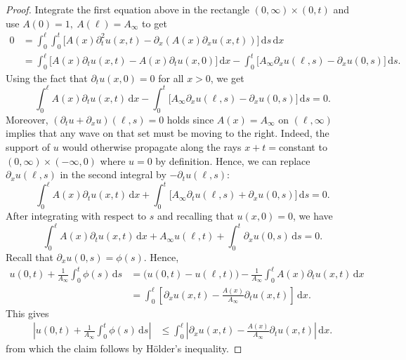 \documentclass[10pt,a4paper]{article}
\theoremstyle{plain}
\theoremstyle{definition}
\theoremstyle{remark}
\numberwithin{equation}{section}
\newcommand{\ds}{\,\mathrm{d}s}
\newcommand{\dx}{\,\mathrm{d}x}
\begin{document}
\begin{proof}
  Integrate the first equation above in the rectangle $(0,\infty) \times (0,t)$ and use $A(0) = 1, \ A(\ell) = A_\infty$ to get
  \begin{align}
    0 &= \int_0 ^{\ell} \int_0^t \big[ A(x) \partial_t^2 u(x,t) - \partial_x (A(x)  \partial_x u(x,t) ) \big] \ds \dx \\
      &= \int_0^{\ell} \big[ A(x) \partial_t u(x,t) - A(x) \partial_t u(x,0) \big] \dx - \int_0^t\big[  A_\infty \partial_x u(\ell,s) -  \partial_x u(0,s) \big] \ds.
  \end{align}
Using the fact that $ \partial_t u(x,0) = 0$ for all $x>0$, we get  
\[
 \int_0^{\ell} A(x) \partial_t u(x,t)  \dx - \int_0^t\big[  A_\infty \partial_x u(\ell,s) -  \partial_x u(0,s) \big] \ds = 0.
\]
Moreover, $(\partial_t u+ \partial_x u )(\ell,s) = 0$ holds since $A(x)=A_\infty$ on $(\ell,\infty)$ implies that any wave on that set must be moving to the right. 
Indeed, the support of $u$ would otherwise propagate along the rays $x+t =$constant to $(0,\infty) \times (-\infty,0)$ where $u=0$ by definition. 
Hence, we can replace $\partial_x u (\ell,s)$ in the second integral by $-\partial_t u (\ell,s)$: 
\[
 \int_0^{\ell}  A(x) \partial_t u(x,t)   \dx + \int_0^t\big[ A_\infty \partial_t u(\ell,s)  +  \partial_x u(0,s) \big] \ds = 0.
\]
After integrating with respect to $s$ and recalling that $u(x,0) = 0$, 
we have
  \begin{equation}
     \int_0^{\ell} A(x) \partial_t u (x,t) \dx +  A_\infty u(\ell,t) + \int_0^t  \partial_x u(0,s) \ds = 0.
  \end{equation}
  Recall that $ \partial_x u(0,s) = \phi(s)$. 
Hence, 
  \begin{align}
      u(0,t) +    \frac{1}{A_\infty}  \int_0^t \phi (s) \ds  &=   \big( u(0,t) -   u(\ell,t) \big) -   \frac{1}{A_\infty} \int_0^{\ell}A(x) \partial_t u(x,t) \dx \\
	&=   \int_0^\ell \left[  \partial_x u(x,t)  -  \frac{A(x)}{A_\infty}  \partial_t u(x,t) \right] \dx.
  \end{align}
This gives
    \begin{align}
     \left|  u(0,t) +    \frac{1}{A_\infty}  \int_0^t \phi (s) \ds  \right|  & \leq  \int_0^\ell \left|  \partial_x u(x,t)  -  \frac{A(x)}{A_\infty}  \partial_t u(x,t) \right| \dx. 
  \end{align}
from which the claim follows by Hölder's inequality. 
\end{proof}
\end{document}
